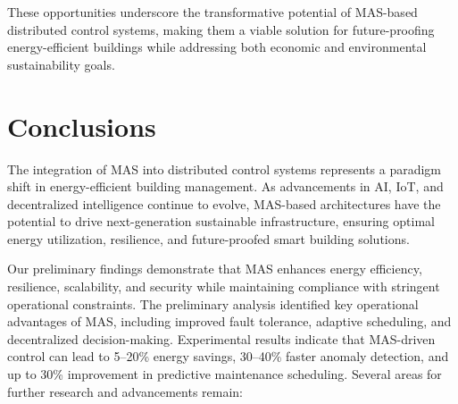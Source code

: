 \documentclass{svproc}
\begin{document}
These opportunities underscore the transformative potential of MAS-based distributed control systems, making them a viable solution for future-proofing energy-efficient buildings while addressing both economic and environmental sustainability goals.


\section{Conclusions}
\label{sec:conclusions}


The integration of MAS into distributed control systems represents a paradigm shift in energy-efficient building management. As advancements in AI, IoT, and decentralized intelligence continue to evolve, MAS-based architectures have the potential to drive next-generation sustainable infrastructure, ensuring optimal energy utilization, resilience, and future-proofed smart building solutions.

Our preliminary findings demonstrate that MAS enhances energy efficiency, resilience, scalability, and security while maintaining compliance with stringent operational constraints. The preliminary analysis identified key operational advantages of MAS, including improved fault tolerance, adaptive scheduling, and decentralized decision-making. Experimental results indicate that MAS-driven control can lead to 5--20\% energy savings, 30--40\% faster anomaly detection, and up to 30\% improvement in predictive maintenance scheduling. Several areas for further research and advancements remain:
\end{document}
